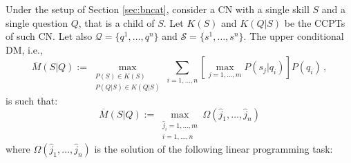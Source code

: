 \documentclass[runningheads]{llncs}
\begin{document}
\begin{theorem}\label{th:dm}
Under the setup of Section \ref{sec:bncat}, consider a CN with a single skill $S$ and a single question $Q$, that is a child of $S$. Let $K(S)$ and $K(Q|S)$ be the CCPTs of such CN. Let also $\mathcal{Q}=\{q^1,\ldots,q^n\}$ and $\mathcal{S}=\{s^1,\ldots,s^n\}$.
The upper conditional DM, i.e.,
\begin{equation}\label{eq:upperM}
\overline{M}(S|Q):=\max_{\substack{P(S)\in K(S)\\P(Q|S)\in K(Q|S)}} \sum_{i=1,\ldots,n} \left[ \max_{j=1,\ldots,m} P(s_j|q_i) \right] P(q_i)\,,
\end{equation}
is such that:
\begin{equation}\label{eq:upperM2}
\overline{M}(S|Q):=\max_{\substack{\hat{j}_i=1,\ldots,m\\i=1,\ldots,n}} \Omega(\hat{j}_1,\ldots,\hat{j}_n)
\end{equation}
where $\Omega(\hat{j}_1,\ldots,\hat{j}_n)$ is the solution of the following linear programming task:


\end{theorem}
\end{document}

